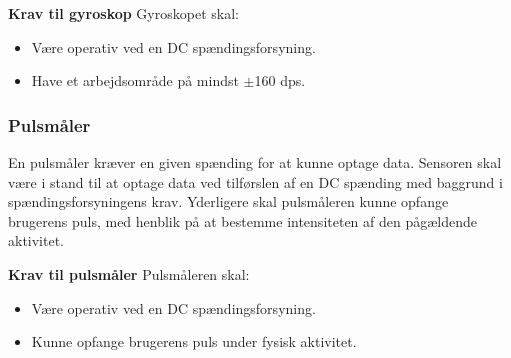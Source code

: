 \textbf{Krav til gyroskop} \newline
Gyroskopet skal:
\begin{itemize}
\item Være operativ ved en DC spændingsforsyning.
\item Have et arbejdsområde på mindst $\pm$160 dps.
\end{itemize}

\subsubsection{Pulsmåler}
En pulsmåler kræver en given spænding for at kunne optage data. Sensoren skal være i stand til at optage data ved tilførslen af en DC spænding med baggrund i spændingsforsyningens krav. Yderligere skal pulsmåleren kunne opfange brugerens puls, med henblik på at bestemme intensiteten af den pågældende aktivitet.

\textbf{Krav til pulsmåler} \newline
Pulsmåleren skal:
\begin{itemize}
\item Være operativ ved en DC spændingsforsyning.
\item Kunne opfange brugerens puls under fysisk aktivitet.
\end{itemize}
%

